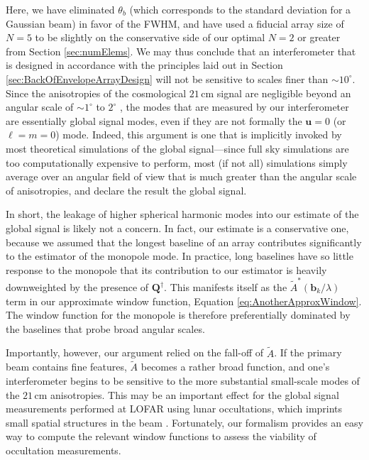 \documentclass[twocolumn,apj,numberedappendix]{emulateapj}
\newcommand{\acl}[1]{{\color{red} \textbf{[ACL:  #1]}}}
\begin{document}
Here, we have eliminated $\theta_b$ (which corresponds to the standard deviation for a Gaussian beam) in favor of the FWHM, and have used a fiducial array size of $N=5$ to be slightly on the conservative side of our optimal $N=2$ or greater from Section \ref{sec:numElems}. We may thus conclude that an interferometer that is designed in accordance with the principles laid out in Section \ref{sec:BackOfEnvelopeArrayDesign} will not be sensitive to scales finer than $\sim 10^\circ$. Since the anisotropies of the cosmological $21\,\textrm{cm}$ signal are negligible beyond an angular scale of $\sim 1^\circ$ to $2^\circ$ \citep{BittnerLoeb2011}, the modes that are measured by our interferometer are essentially global signal modes, even if they are not formally the $\mathbf{u} = 0$ (or $\ell = m = 0$) mode. Indeed, this argument is one that is implicitly invoked by most theoretical simulations of the global signal---since full sky simulations are too computationally expensive to perform, most (if not all) simulations simply average over an angular field of view that is much greater than the angular scale of anisotropies, and declare the result the global signal.

In short, the leakage of higher spherical harmonic modes into our estimate of the global signal is likely not a concern. In fact, our estimate is a conservative one, because we assumed that the longest baseline of an array contributes significantly to the estimator of the monopole mode. In practice, long baselines have so little response to the monopole that its contribution to our estimator is heavily downweighted by the presence of $\mathbf{Q}^\dagger$. This manifests itself as the $\widetilde{A}^* ( \mathbf{b}_k / \lambda )$ term in our approximate window function, Equation \eqref{eq:AnotherApproxWindow}. The window function for the monopole is therefore preferentially dominated by the baselines that probe broad angular scales.

Importantly, however, our argument relied on the fall-off of $\widetilde{A}$. If the primary beam contains fine features, $\widetilde{A}$ becomes a rather broad function, and one's interferometer begins to be sensitive to the more substantial small-scale modes of the $21\,\textrm{cm}$ anisotropies. This may be an important effect for the global signal measurements performed at LOFAR using lunar occultations, which imprints small spatial structures in the beam \citep{VedanthamLOFAR2}. Fortunately, our formalism provides an easy way to compute the relevant window functions to assess the viability of occultation measurements.
\end{document}
